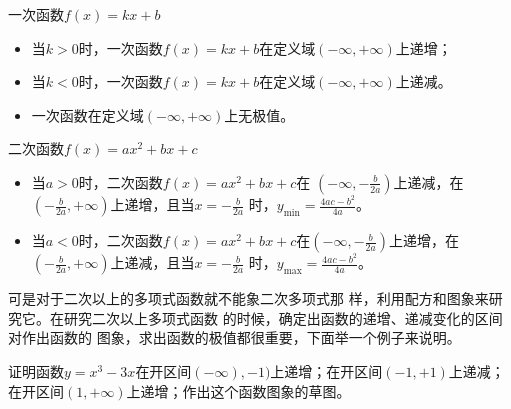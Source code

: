 一次函数$f(x)=kx+b$
\begin{itemize}
    \item 当$k>0$时，一次函数$f(x)=kx+b$在定义域$(-\infty,+\infty)$上递增；
\item 当$k<0$时，一次函数$f(x)=kx+b$在定义域$(-\infty,+\infty)$上递减。
\item 一次函数在定义域$(-\infty,+\infty)$上无极值。
\end{itemize}

二次函数$f(x)=ax^2+bx+c$
\begin{itemize}
    \item 当$a>0$时，二次函数$f(x)=ax^2+bx+c$在
$\left(-\infty,-\frac{b}{2a}\right)$上递减，在$\left(-\frac{b}{2a},+\infty\right)$上递增，且当$x=-\frac{b}{2a}$
时，$y_{\min}=\frac{4ac-b^2}{4a}$。
\item 当$a<0$时，二次函数$f(x)=ax^2+bx+c$在$\left(-\infty,-\frac{b}{2a}\right)$上递增，在$\left(-\frac{b}{2a},+\infty\right)$上递减，且当$x=-\frac{b}{2a}$
时，$y_{\max}=\frac{4ac-b^2}{4a}$。
\end{itemize}


可是对于二次以上的多项式函数就不能象二次多项式那
样，利用配方和图象来研究它。在研究二次以上多项式函数
的时候，确定出函数的递增、递减变化的区间对作出函数的
图象，求出函数的极值都很重要，下面举一个例子来说明。

\begin{example}
证明函数$y=x^3-3x$在开区间$(-\infty),-1)$上递增；在开区间$(-1,+1)$上递减；
在开区间$(1,+\infty)$上递增；作出这个函数图象的草图。
\end{example}

